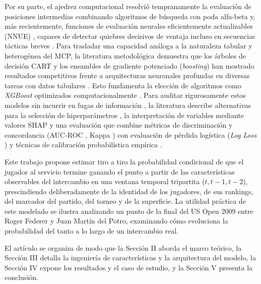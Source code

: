 \documentclass[journal]{IEEEtran}
\begin{document}
Por su parte, el ajedrez computacional resolvió tempranamente la evaluación de posiciones intermedias combinando algoritmos de búsqueda con poda alfa-beta \cite{knuth1975analysis} y, más recientemente, funciones de evaluación neurales eficientemente actualizables (NNUE) \cite{nasu2018nnue, Klein2022NeuralNF, stockfish_nnue}, capaces de detectar quiebres decisivos de ventaja incluso en secuencias tácticas breves \cite{hooper1992oxford}. Para trasladar una capacidad análoga a la naturaleza tabular y heterogénea del MCP, la literatura metodológica demuestra que los árboles de decisión CART \cite{breiman1984classification} y los ensambles de gradiente potenciado (\textit{boosting}) \cite{hastie2009elements} han mostrado resultados competitivos frente a arquitecturas neuronales profundas en diversas tareas con datos tabulares \cite{grinsztajn2022tree}. Esto fundamenta la elección de algoritmos como \textit{XGBoost} \cite{chen2016xgboost} optimizados computacionalmente \cite{mitchell2017xgboostgpu}. Para auditar rigurosamente estos modelos sin incurrir en fugas de información \cite{kaufman2012leakage}, la literatura describe alternativas para la selección de hiperparámetros \cite{bergstra2012random}, la interpretación de variables mediante valores SHAP \cite{lundberg2017unified} y una evaluación que combine métricas de discriminación y concordancia (AUC-ROC \cite{fawcett2006introduction, hanley1982meaning}, Kappa \cite{cohen1960coefficient}) con evaluación de pérdida logística (\textit{Log Loss} \cite{good1952rational, bishop2006pattern}) y técnicas de calibración probabilística empírica \cite{brier1950verification, platt1999probabilistic, zadrozny2002transforming, guo2017calibration}.

Este trabajo propone estimar tiro a tiro la probabilidad condicional de que el jugador al servicio termine ganando el punto a partir de las características observables del intercambio en una ventana temporal tripartita ($t, t-1, t-2$), prescindiendo deliberadamente de la identidad de los jugadores, de sus rankings, del marcador del partido, del torneo y de la superficie. La utilidad práctica de este modelado se ilustra analizando un punto de la final del US Open 2009 entre Roger Federer y Juan Martín del Potro, examinando cómo evoluciona la probabilidad del tanto a lo largo de un intercambio real.

El artículo se organiza de modo que la Sección II aborda el marco teórico, la Sección III detalla la ingeniería de características y la arquitectura del modelo, la Sección IV expone los resultados y el caso de estudio, y la Sección V presenta la conclusión.
\end{document}
